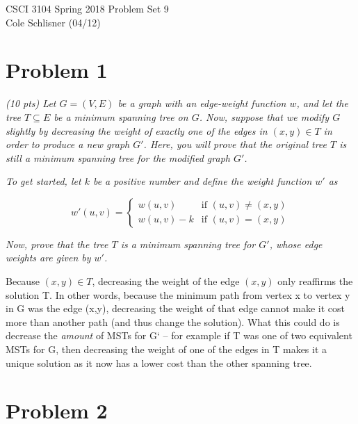 \documentclass[12pt]{article} \setlength{\oddsidemargin}{0in}
\begin{document}
\noindent CSCI 3104 Spring 2018 \hfill Problem Set 9\\
Cole Schlisner (04/12)

\graphicspath{ {images/} }

\hrulefill

{\selectfont}

\section*{Problem 1}

\textit{(10 pts) Let $G = (V, E)$ be a graph with an edge-weight function $w$, and let the tree
$T \subseteq E$ be a minimum spanning tree on $G$. Now, suppose that we modify $G$ slightly by
decreasing the weight of exactly one of the edges in $(x, y) \in T$ in order to produce a
new graph $G'$. Here, you will prove that the original tree $T$ is still a minimum spanning
tree for the modified graph $G'$.}

\textit{To get started, let $k$ be a positive number and define the weight function $w'$ as}

$$
w'(u,v) =
  \begin{cases}
    w(u,v) & \text{if $(u,v) \ne (x,y)$} \\
    w(u,v)-k & \text{if $(u,v) = (x,y)$}
  \end{cases}
  $$

\textit{Now, prove that the tree $T$ is a minimum spanning tree for $G'$, whose edge weights are
given by $w'$.}

Because $(x,y) \in T$, decreasing the weight of the edge $(x,y)$ only reaffirms the solution T. In other words, because the minimum path from vertex x to vertex y in G was the edge (x,y), decreasing the weight of that edge cannot make it cost more than another path (and thus change the solution). What this could do is decrease the \textit{amount} of MSTs for G` -- for example if T was one of two equivalent MSTs for G, then decreasing the weight of one of the edges in T makes it a unique solution as it now has a lower cost than the other spanning tree. 

\newpage

\section*{Problem 2}
\end{document}
